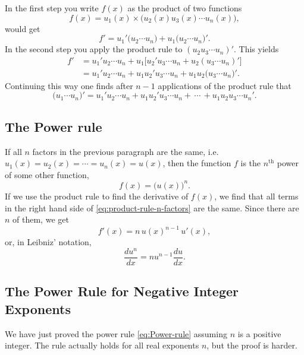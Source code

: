 In the first step you write $f(x)$ as the product of two functions
\[
f(x) = u_1(x) \times \bigl(u_2(x)u_3(x)\cdots u_n(x)\bigr),
\]
would get
\[
f' = u_1' \bigl(u_2\cdots u_n\bigr) + u_1\bigl(u_2\cdots u_n\bigr)'.
\]
In the second step you apply the product rule to $(u_2u_3\cdots
u_n)'$.  This yields
\begin{align*}
  f'
  &= u_1' u_2\cdots u_n + u_1\bigl[u_2'u_3\cdots u_n+u_2(u_3\cdots
  u_n)'\bigr]\\
  &= u_1'u_2\cdots u_n + u_1u_2'u_3\cdots u_n + u_1u_2\bigl(u_3\cdots
  u_n\bigr)'.
\end{align*}
Continuing this way one finds after $n-1$ applications of the product rule
that
\begin{equation}
  \label{eq:product-rule-n-factors}
  \bigl(u_1\cdots u_n\bigr)'
  = u_1'u_2\cdots u_n + u_1u_2'u_3\cdots u_n +\, \cdots\, + u_1u_2u_3\cdots
  u_n'.
\end{equation}








\subsection{The Power rule} 
If all $n$ factors in the previous paragraph are the same, i.e.\ $u_1(x) =
u_2(x) = \cdots = u_n(x) = u(x)$, then the function $f$ is the
$n^{\text{th}}$ power of some other function,
\[
f(x) = \bigl(u(x)\bigr)^n.
\]
If we use the product rule to find the derivative of $f(x)$, we find that
all terms in the right hand side of \eqref{eq:product-rule-n-factors} are
the same.  Since there are $n$ of them, we get
\[
f'(x) = n\, u(x)^{n-1}\, u'(x),
\]
or, in Leibniz' notation,
\begin{equation}
  \label{eq:Power-rule}
  \frac{du^n}{dx} = nu^{n-1}\frac{du}{dx}.
\end{equation}












\subsection{The Power Rule for Negative Integer Exponents} 
We have just proved the power rule \eqref{eq:Power-rule} assuming $n$ is a
positive integer.  The rule actually holds for all real exponents $n$, but
the proof is harder.  




